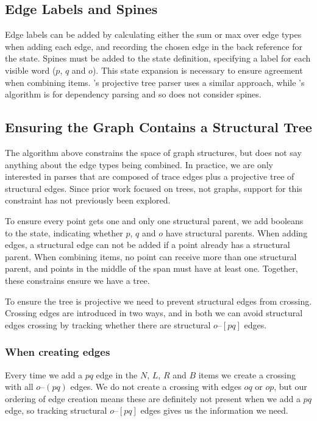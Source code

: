 \subsection{Edge Labels and Spines}\label{sec:labels}
Edge labels can be added by calculating either the sum or max over edge types when adding each edge, and recording the chosen edge in the back reference for the state.
Spines must be added to the state definition, specifying a label for each visible word ($p$, $q$ and $o$).
This state expansion is necessary to ensure agreement when combining items.
\textcite{cck}'s projective tree parser uses a similar approach, while \textcite{ec}'s algorithm is for dependency parsing and so does not consider spines.

\subsection{Ensuring the Graph Contains a Structural Tree}
The algorithm above constrains the space of graph structures, but does not say anything about the edge types being combined.
In practice, we are only interested in parses that are composed of trace edges plus a projective tree of structural edges.
Since prior work focused on trees, not graphs, support for this constraint has not previously been explored.

To ensure every point gets one and only one structural parent, we add booleans to the state, indicating whether $p$, $q$ and $o$ have structural parents.
When adding edges, a structural edge can not be added if a point already has a structural parent.
When combining items, no point can receive more than one structural parent, and points in the middle of the span must have at least one.
Together, these constrains ensure we have a tree.

To ensure the tree is projective we need to prevent structural edges from crossing.
Crossing edges are introduced in two ways, and in both we can avoid structural edges crossing by tracking whether there are structural $o$--$[pq]$ edges.

\subsubsection{When creating edges}
Every time we add a $pq$ edge in the $N$, $L$, $R$ and $B$ items we create a crossing with all $o$--$(pq)$ edges.
We do not create a crossing with edges $oq$ or $op$, but our ordering of edge creation means these are definitely not present when we add a $pq$ edge, so tracking structural $o$--$[pq]$ edges gives us the information we need.

